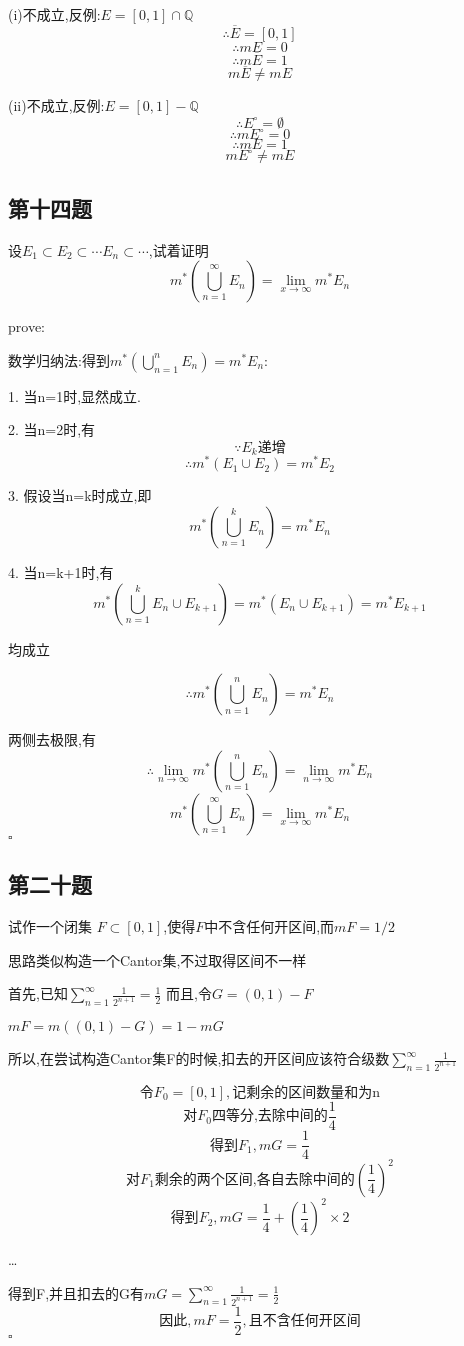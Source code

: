 \documentclass[a4paper]{article}
\begin{document}
    (i)不成立,反例:$E=[0,1]\cap \mathbb{Q}$
    \[\therefore \overline{E}=[0,1]\]
    \[\therefore mE = 0\]
    \[\therefore m\overline{E}=1\]
    \[m\overline{E}\ne mE\]

    (ii)不成立,反例:$E=[0,1] - \mathbb{Q}$
    \[\therefore E^{\circ} = \emptyset\]
    \[\therefore mE^{\circ} = 0\]
    \[\therefore mE = 1\]
    \[mE^{\circ} \ne mE\]

    \subsection{第十四题}
    设$E_1\subset E_2 \subset \cdots E_n \subset \cdots$,试着证明
    \[m^{*}(\bigcup_{n=1}^{\infty}E_n)= \lim_{x\to \infty} m^{*}E_n\]

    prove:

    数学归纳法:得到$m^{*}(\bigcup_{n=1}^{n}E_n)=m^{*}E_n$:

    1. 当n=1时,显然成立.

    2. 当n=2时,有
    \[\because {E_k}\text{递增}\]
    \[\therefore m^{*}(E_1 \cup E_2)=m^*E_2\]

    3. 假设当n=k时成立,即
    \[m^{*}(\bigcup_{n=1}^{k}E_n)=m^{*}E_n\]

    4. 当n=k+1时,有
    \[m^{*}(\bigcup_{n=1}^{k}E_n \cup E_{k+1})=m^{*}(E_n\cup E_{k+1})=m^{*}E_{k+1}\]
    
    均成立

    \[\therefore m^{*}(\bigcup_{n=1}^{n}E_n)=m^{*}E_n\]

    两侧去极限,有
    \[\therefore \lim_{n\to \infty} m^{*}(\bigcup_{n=1}^{n}E_n)=\lim_{n\to \infty} m^{*}E_n\]
    \[m^{*}(\bigcup_{n=1}^{\infty}E_n)= \lim_{x\to \infty} m^{*}E_n\]
    \hfill $\square$


    \subsection{第二十题}
    试作一个闭集 $F\subset[0,1]$,使得$F$中不含任何开区间,而$mF=1/2$

        思路类似构造一个Cantor集,不过取得区间不一样

        首先,已知$\sum_{n=1}^{\infty} \frac{1}{2^{n+1}} = \frac{1}{2}$
        而且,令$G=(0,1)-F$

        $mF=m((0,1)-G)=1-mG$
        
        所以,在尝试构造Cantor集F的时候,扣去的开区间应该符合级数$\sum_{n=1}^{\infty} \frac{1}{2^{n+1}}$

        \[\text{令}F_0=[0,1],\text{记剩余的区间数量和为n}\]
        \[\text{对}F_0\text{四等分,去除中间的}\frac{1}{4}\]
        \[\text{得到}F_1,mG=\frac{1}{4}\]
        \[\text{对}F_1\text{剩余的两个区间,各自去除中间的}(\frac{1}{4})^2\]
        \[\text{得到}F_2,mG=\frac{1}{4} + (\frac{1}{4})^2\times2\]

        \ldots

        得到F,并且扣去的G有$mG=\sum_{n=1}^{\infty} \frac{1}{2^{n+1}} = \frac{1}{2}$
        \[\text{因此},mF=\frac{1}{2},\text{且不含任何开区间}\]
    \hfill $\square$
\end{document}
